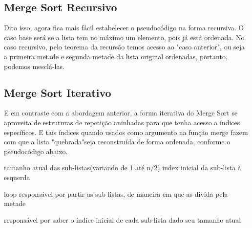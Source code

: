 \FloatBarrier

\newpage

\subsection{Merge Sort Recursivo}

Dito isso, agora fica mais fácil estabelecer o pseudocódigo na forma recursiva. O caso base será se a lista tem no máximo um elemento, pois já está ordenada. No caso recursivo, pelo teorema da recursão temos acesso ao "caso anterior", ou seja a primeira metade e segunda metade da lista original ordenadas, portanto, podemos mesclá-las.

\begin{algorithm}
	\label{algo:merge_sort_pseudo}
	\begin{algorithmic}[1]
		 \Return
		\EndIf
		\State {}
		\EndFunction
	\end{algorithmic}
\end{algorithm}

\FloatBarrier

\subsection{Merge Sort Iterativo}

E em contraste com a abordagem anterior, a forma iterativa do Merge Sort se aproveita de estruturas de repetição aninhadas para que tenha acesso a índices específicos. E tais índices quando usados como argumento na função merge fazem com que a lista "quebrada"\text{ }seja reconstruída de forma ordenada, conforme o pseudocódigo abaixo.

\begin{algorithm}
	\label{algo:merge_sort_it_pseudo}
	\begin{algorithmic}[1]
		\Comment tamanho atual das sub-listas(variando de 1 até n/2)
		\Comment index inicial da sub-lista à esquerda

		\Comment loop responsável por partir as sub-listas, de maneira em que as divida pela metade


		\Comment responsável por saber o índice inicial de cada sub-lista dado seu tamanho atual
		\EndFor
		\EndFor
		\EndFunction
	\end{algorithmic}
\end{algorithm}


